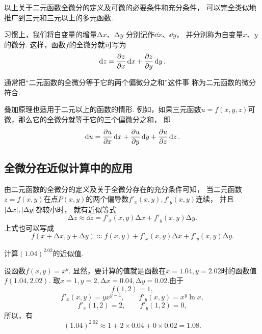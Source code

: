 以上关于二元函数全微分的定义及可微的必要条件和充分条件，
可以完全类似地推广到三元和三元以上的多元函数.

习惯上，我们将自变量的增量\(\increment x\)、\(\increment y\)
分别记作\(\dd{x}\)、\(\dd{y}\)，
并分别称为自变量\(x\)、\(y\)的微分.
这样，函数\(f\)的全微分就可写为\[
	\dd{z}=\pdv{z}{x}\dd{x}+\pdv{z}{y}\dd{y}.
\]

通常把“二元函数的全微分等于它的两个偏微分之和”这件事
称为二元函数的微分符合.

叠加原理也适用于二元以上的函数的情形.
例如，如果三元函数\(u = f(x,y,z)\)可微，那么它的全微分就等于它的三个偏微分之和，
即\[
	\dd{u} = \pdv{u}{x} \dd{x} + \pdv{u}{y} \dd{y} + \pdv{u}{z} \dd{z}.
\]

\subsection{全微分在近似计算中的应用}
由二元函数的全微分的定义及关于全微分存在的充分条件可知，
当二元函数\(z = f(x,y)\)在点\(P(x,y)\)的两个偏导数\(f'_x(x,y),f'_y(x,y)\)连续，
并且\(\abs{\Delta x},\abs{\Delta y}\)都较小时，
就有近似等式\[
	\increment z \approx \dd{z} = f'_x(x,y) \increment x + f'_y(x,y) \increment y.
\]
上式也可以写成\[
	f(x+\increment x,y+\increment y) \approx f(x,y) + f'_x(x,y) \increment x + f'_y(x,y) \increment y.
\]

\begin{example}
计算\((1.04)^{2.02}\)的近似值.
\begin{solution}
设函数\(f(x,y) = x^y\).
显然，要计算的值就是函数在\(x=1.04,y=2.02\)时的函数值\(f(1.04,2.02)\).
取\(x=1,y=2,\increment x=0.04,\increment y=0.02\).由于\[
	f(1,2)=1,
\]\[
	f'_x(x,y) = y x^{y-1}, \qquad f'_y(x,y) = x^y \ln x,
\]\[
	f'_x(1,2) = 2, \qquad f'_y(1,2) = 0,
\]
所以，有\[
	(1.04)^{2.02} \approx 1 + 2 \times 0.04 + 0 \times 0.02 = 1.08.
\]
\end{solution}
\end{example}
